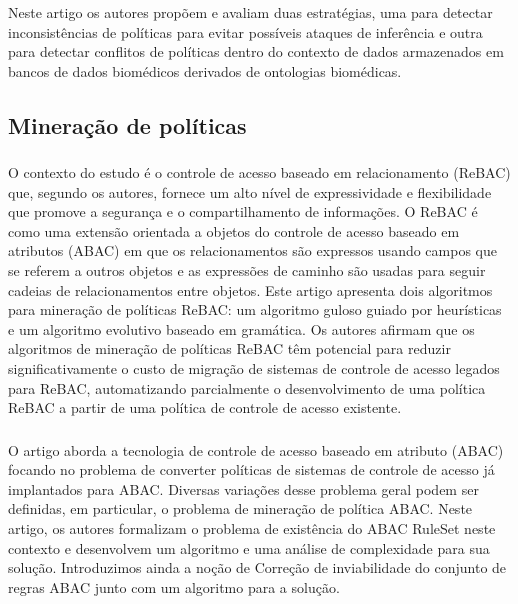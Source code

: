 \subsubsection{}
Neste artigo os autores propõem e avaliam duas estratégias, uma para detectar inconsistências de políticas para evitar possíveis ataques de inferência e outra para detectar conflitos de políticas dentro do contexto de dados armazenados em bancos de dados biomédicos derivados de ontologias biomédicas.

\subsection{Mineração de políticas}\label{sec:mineracao-politicas}
\subsubsection{  }
O contexto do estudo é o controle de acesso baseado em relacionamento (ReBAC) que, segundo os autores, fornece um alto nível de expressividade e flexibilidade que promove a segurança e o compartilhamento de informações. O ReBAC é como uma extensão orientada a objetos do controle de acesso baseado em atributos (ABAC) em que os relacionamentos são expressos usando campos que se referem a outros objetos e as expressões de caminho são usadas para seguir cadeias de relacionamentos entre objetos. Este artigo apresenta dois algoritmos para mineração de políticas ReBAC: um algoritmo guloso guiado por heurísticas e um algoritmo evolutivo baseado em gramática. Os autores afirmam que os algoritmos de mineração de políticas ReBAC têm potencial para reduzir significativamente o custo de migração de sistemas de controle de acesso legados para ReBAC, automatizando parcialmente o desenvolvimento de uma política ReBAC a partir de uma política de controle de acesso existente.

\subsubsection{}
O artigo aborda a tecnologia de controle de acesso baseado em atributo (ABAC) focando no problema de converter políticas de sistemas de controle de acesso já implantados para ABAC. Diversas variações desse problema geral podem ser definidas, em particular, o problema de mineração de política ABAC. Neste artigo, os autores formalizam o problema de existência do ABAC RuleSet neste contexto e desenvolvem um algoritmo e uma análise de complexidade para sua solução. Introduzimos ainda a noção de Correção de inviabilidade do conjunto de regras ABAC junto com um algoritmo para a solução.

